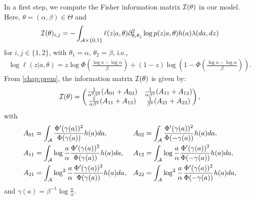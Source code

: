          In a first step, we compute the Fisher information matrix $\mathcal{I}(\theta)$ in our model. 
        Here, $\theta=(\alpha,\beta)\in \Theta$ and 
            \begin{equation}
                \mathcal{I}(\theta)_{i,j}= -\int_{\mathcal{A} \times \{0,1\}} \ell(z|a,\theta)\partial^2_{\theta_i\theta_j} \log p(z|a,\theta) h(a)\lambda(da,dz)
            \end{equation}
        for $i,j\in\{1,2\}$, with $\theta_1=\alpha$, $\theta_2=\beta$, i.e.,
            \begin{align}
                \log \ell(z|a,\theta) %
                = z\log\Phi\left(\frac{\log a-\log\alpha}{\beta}\right) + (1-z)\log\left(1-\Phi\left(\frac{\log a-\log\alpha}{\beta}\right)\right).
            \end{align}
	From \cref{chap:prem}, the information matrix $\mathcal{I}(\theta)$ is given by:
        \begin{equation}
            \mathcal{I}(\theta)=\begin{pmatrix}
            \frac{1}{\alpha^2\beta^2}(A_{01} + A_{02}) & \frac{1}{\alpha\beta^3}(A_{11}+A_{12}) \\
            \frac{1}{\alpha\beta^3}(A_{11}+A_{12}) & \frac{1}{\beta^4}(A_{21}+A_{22})
        \end{pmatrix}  ,
        \end{equation}
with
           \begin{equation} \label{uncIM:eq:Aij}
        \begin{aligned}
            A_{01} &= \int_{\mathcal{A}}\frac{\Phi'(\gamma(a))^2}{\Phi(\gamma(a))}h(a)da,
            & A_{02} &= \int_{\mathcal{A}}\frac{\Phi'(\gamma(a))^2}{\Phi(-\gamma(a))}h(a)da,\\
            A_{11} &= \int_{\mathcal{A}}\log\frac{a}{\alpha}\frac{\Phi'(\gamma(a))^2}{\Phi(\gamma(a))}h(a)da,
            & A_{12} &= \int_{\mathcal{A}}\log\frac{a}{\alpha}\frac{\Phi'(\gamma(a))^2}{\Phi(-\gamma(a))}h(a)da,\\
            A_{21} &= \int_{\mathcal{A}}\log^2\frac{a}{\alpha}\frac{\Phi'(\gamma(a))^2}{\Phi(\gamma(a))}h(a)da,
            & A_{22} &= \int_{\mathcal{A}}\log^2\frac{a}{\alpha}\frac{\Phi'(\gamma(a))^2}{\Phi(-\gamma(a))}h(a)da,\\
        \end{aligned}
        \end{equation}
and $\gamma(a)=\beta^{-1}\log\frac{a}{\alpha}$.
        
